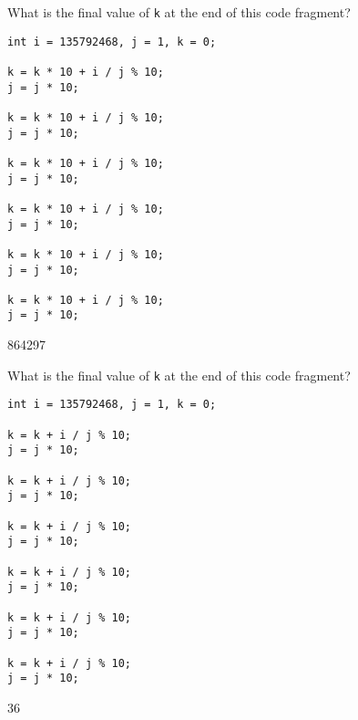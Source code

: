 \nextq
What is the final value of \verb!k! at the end of this code fragment?
\begin{Verbatim}[fontsize=\footnotesize,frame=single]
int i = 135792468, j = 1, k = 0;

k = k * 10 + i / j % 10;
j = j * 10;

k = k * 10 + i / j % 10;
j = j * 10;

k = k * 10 + i / j % 10;
j = j * 10;

k = k * 10 + i / j % 10;
j = j * 10;

k = k * 10 + i / j % 10;
j = j * 10;

k = k * 10 + i / j % 10;
j = j * 10;
\end{Verbatim}
\ANSWER
\begin{answercode}
864297
\end{answercode}

\nextq
What is the final value of \verb!k! at the end of this code fragment?
\begin{Verbatim}[fontsize=\footnotesize,frame=single]
int i = 135792468, j = 1, k = 0;

k = k + i / j % 10;
j = j * 10;

k = k + i / j % 10;
j = j * 10;

k = k + i / j % 10;
j = j * 10;

k = k + i / j % 10;
j = j * 10;

k = k + i / j % 10;
j = j * 10;

k = k + i / j % 10;
j = j * 10;
\end{Verbatim}
\ANSWER
\begin{answercode}
36
\end{answercode}


